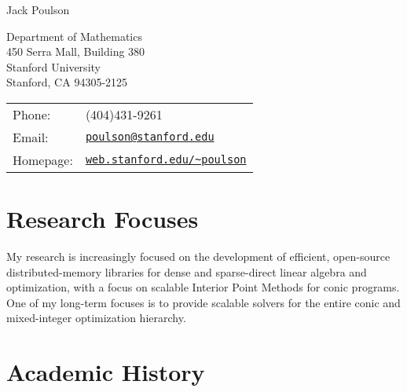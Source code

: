 \documentclass[letterpaper]{article}
\def\name{Jack Poulson}
\begin{document}
{\huge \name}

\vspace{0.25in}

\begin{minipage}{0.45\linewidth}
  Department of Mathematics \\
  450 Serra Mall, Building 380 \\
  Stanford University \\
  Stanford, CA 94305-2125
\end{minipage}
\begin{minipage}{0.45\linewidth}
  \begin{tabular}{ll}
    Phone:&(404)431-9261 \\
    Email:&\href{mailto:poulson@stanford.edu}{\tt poulson@stanford.edu} \\
    Homepage: & \href{http://web.stanford.edu/~poulson}{\tt web.stanford.edu/\textasciitilde poulson} \\
  \end{tabular}
\end{minipage}

\section*{Research Focuses}
My research is increasingly focused on the development of efficient, 
open-source distributed-memory libraries for dense and sparse-direct 
linear algebra and optimization, with a focus on scalable Interior Point 
Methods for conic programs. One of my long-term focuses is to provide scalable 
solvers for the entire conic and mixed-integer optimization hierarchy. 

\section*{Academic History}
\end{document}
